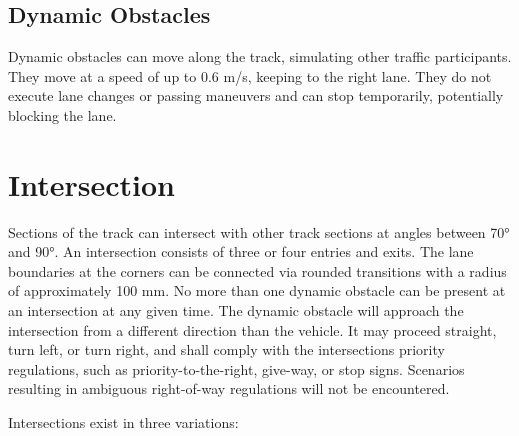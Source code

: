 \subsection{Dynamic Obstacles}
\label{dynamic_obstacle}

Dynamic obstacles can move along the track, simulating other traffic participants.
They move at a speed of up to 0.6 m/s, keeping to the right lane.
They do not execute lane changes or passing maneuvers and can stop temporarily, potentially blocking the lane.

\section{Intersection}
\label{intersection}

Sections of the track can intersect with other track sections at angles between 70° and 90°.
An intersection consists of three or four entries and exits.
The lane boundaries at the corners can be connected via rounded transitions with a radius of approximately 100 mm.
No more than one dynamic obstacle can be present at an intersection at any given time.
The dynamic obstacle will approach the intersection from a different direction than the vehicle. It may proceed straight, turn left, or turn right, and shall comply with the intersections priority regulations, such as priority-to-the-right, give-way, or stop signs.
Scenarios resulting in ambiguous right-of-way regulations will not be encountered.

Intersections exist in three variations:


